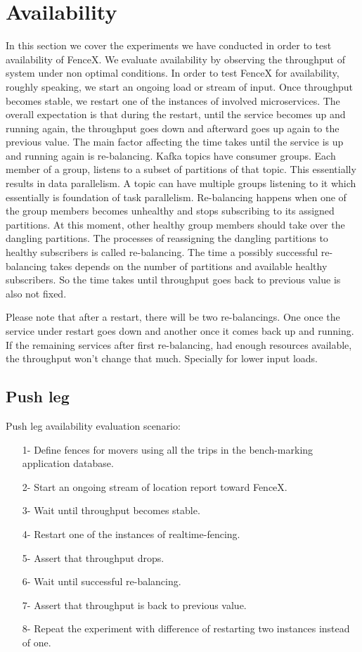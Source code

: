 \documentclass[a4]{report}
\begin{document}
    \section{Availability}
    In this section we cover the experiments we have conducted in order to test availability of FenceX.
    We evaluate availability by observing the throughput of system under non optimal conditions.
    In order to test FenceX for availability, roughly speaking, we start an ongoing load or stream of input.
    Once throughput becomes stable, we restart one of the instances of involved microservices.
    The overall expectation is that during the restart, until the service becomes up and running again, the throughput
    goes down and afterward goes up again to the previous value.
    The main factor affecting the time takes until the service is up and running again is re-balancing.
    Kafka topics have consumer groups.
    Each member of a group, listens to a subset of partitions of that topic.
    This essentially results in data parallelism.
    A topic can have multiple groups listening to it which essentially is foundation of task parallelism.
    Re-balancing happens when one of the group members becomes unhealthy and stops subscribing to its assigned
    partitions.
    At this moment, other healthy group members should take over the dangling partitions.
    The processes of reassigning the dangling partitions to healthy subscribers is called re-balancing.
    The time a possibly successful re-balancing takes depends on the number of partitions and available
    healthy subscribers.
    So the time takes until throughput goes back to previous value is also not fixed.

    Please note that after a restart, there will be two re-balancings.
    One once the service under restart goes down and another once it comes back up and running.
    If the remaining services after first re-balancing, had enough resources available, the throughput won't change
    that much.
    Specially for lower input loads.

    \subsection{Push leg}
    Push leg availability evaluation scenario:
    \begin{itemize}
        \item[1-] Define fences for movers using all the trips in the bench-marking application database.
        \item[2-] Start an ongoing stream of location report toward FenceX.
        \item[3-] Wait until throughput becomes stable.
        \item[4-] Restart one of the instances of realtime-fencing.
        \item[5-] Assert that throughput drops.
        \item[6-] Wait until successful re-balancing.
        \item[7-] Assert that throughput is back to previous value.
        \item[8-] Repeat the experiment with difference of restarting two instances instead of one.
    \end{itemize}
\end{document}
